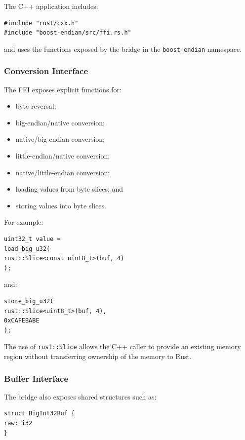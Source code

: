 The C++ application includes:

\begin{lstlisting}[style=cppblock]
#include "rust/cxx.h"
#include "boost-endian/src/ffi.rs.h"
\end{lstlisting}

and uses the functions exposed by the bridge in the \texttt{boost\_endian} namespace.

\subsubsection{Conversion Interface}

The FFI exposes explicit functions for:

\begin{itemize}
\item byte reversal;
\item big-endian/native conversion;
\item native/big-endian conversion;
\item little-endian/native conversion;
\item native/little-endian conversion;
\item loading values from byte slices; and
\item storing values into byte slices.
\end{itemize}

For example:

\begin{lstlisting}[style=cppblock]
uint32_t value =
load_big_u32(
rust::Slice<const uint8_t>(buf, 4)
);
\end{lstlisting}

and:

\begin{lstlisting}[style=cppblock]
store_big_u32(
rust::Slice<uint8_t>(buf, 4),
0xCAFEBABE
);
\end{lstlisting}

The use of \texttt{rust::Slice} allows the C++ caller to provide an existing memory region without transferring ownership of the memory to Rust.

\subsubsection{Buffer Interface}

The bridge also exposes shared structures such as:

\begin{lstlisting}[style=rustblock]
struct BigInt32Buf {
raw: i32
}
\end{lstlisting}

